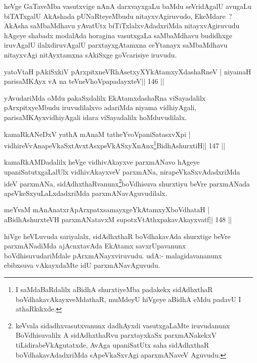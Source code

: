 \begin{artha}
heVge GaTaveMba vasutxvige nAnA darxvayxgaLu baMdu seVridAgalU avugaLu biTATxgalU AkAshada pUNaRteyeMbudu nitayxvAgiruvudo, EkeMdare~? AkAsha saMbaMdhavu yAvatUtx biTiTxlalxvAdadxriMda nitayxvAgiruvudu hAgeye shabadx modalAda horagina vasutxgaLa saMbaMdhavu budidhxge iruvAgalU ilalxdiruvAgalU parxtayxgAtamxna ceYtanayx saMbaMdhavu nitayxvAgi nitAyxtamxna sAkiSxge goVcarisiye iruvudu.
\end{artha}

\begin{shl}
yatoV\s taH pAkiSxkiV pArxpitxneVRhAsetxyXYkAtamxyXdashaRneV |
niyamaH parisaMKAyx vA na teVneVhoVpapadayxteV\hfill || 146 ||
\end{shl}

\begin{artha}
yAvudariMda oMdu pakaSxdalilx EkAtamxdashaRna viSayadalilx pArxpitxyeMbudu iruvudilalxvo adariMda niyama vidhiyAgali, parisaMKAyxvidhiyAgali idara viSayadalilx hoMduvudilalx.
\end{artha}


\begin{shl}
kamaRkANeDxV yathA mAnaM tatheYvoVpaniSatasxvXpi |
vidhireVvAnapeVkaSxtAvxtAsxpeVkASxyXnAnx\footnote{I saMdaBaRdalilx aBidhA shurxtiyeMba padakekx sidAdhxthaR boVdhakavAkayxveMdathaR, muMdeyU hiVgeye aBidhA eMdu padavU I athaRkikxde.}BidhAshurxtiH\hfill || 147 ||
\end{shl}

\begin{artha}
kamaRkAMDadalilx heVge vidhivAkayxve parxmANavo hAgeye upaniSatutxgaLalUlx vidhivAkayxveV parxmANa, nirapeVkaSxvAdadxriMda ideV parxmANa, sidAdhxthaRvanunx\break \footnote{keVvala sidadhxvasutxvanunx dadhAyxdi vasutxgaLaMte iruvudanunx BoVdhisuvalilx A sidAdhxthaRvu parxtayxkaSx parxmANakekxV tiLidirabeVkAgutatxde, AvAga upaniSatUtx saha sidAdhxthaR boVdhakavAdadxriMda sApeVkaSxvAgi aparxmANaveV Aguvudu.}boVdhisuva shurxtiyu beVre parxmANada apeVkeSxyuLaLxdadxriMda parxmANavAguvudilalx.
\end{artha}


\begin{shl}
meYvaM mAnAnatxrApArxpatxsamayxgeYkAtamxyXboVdhataH |
aBidhAshurxteVH parxmANatavxM supotxVtAthxpakavAkayxvatf\hfill || 148 ||
\end{shl}

\begin{artha}
hiVge heVLuvuda sariyalalx, sidAdhxthaR boVdhakavAda shurxtige beVre parxmANadiMda ajAcnxtavAda EkAtamx savxrUpavanunx boVdhisuvudariMdale pArxmANayxviruvudu. udA:- malagidavananunx ebibxsuva vAkayxdaMte idU parxmANavAguvudu.
\end{artha}

